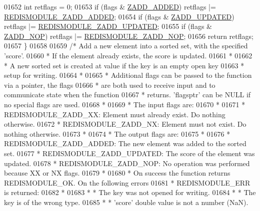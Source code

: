 \begin{DoxyCode}
{{{01652     \textcolor{keywordtype}{int} retflags = 0;
01653     \textcolor{keywordflow}{if} (flags & \hyperlink{server_8h_a2c0f3e2c3a5c73496b732648c69eda18}{ZADD\_ADDED}) retflags |= \hyperlink{redismodule_8h_a5c69099d5d3846f1634c335998a88086}{REDISMODULE\_ZADD\_ADDED};
01654     \textcolor{keywordflow}{if} (flags & \hyperlink{server_8h_aabb6bb7a2a2e73ab9fcda97cf704761b}{ZADD\_UPDATED}) retflags |= 
      \hyperlink{redismodule_8h_a616a231cd3922fde9daac0ff29c8bfdc}{REDISMODULE\_ZADD\_UPDATED};
01655     \textcolor{keywordflow}{if} (flags & \hyperlink{server_8h_afd0096ac4bedddb9b0b7f27396839c06}{ZADD\_NOP}) retflags |= \hyperlink{redismodule_8h_ad63e6e9dea8d9b3d736241007f039268}{REDISMODULE\_ZADD\_NOP};
01656     \textcolor{keywordflow}{return} retflags;
01657 \}
01658 
01659 \textcolor{comment}{/* Add a new element into a sorted set, with the specified 'score'.}
01660 \textcolor{comment}{ * If the element already exists, the score is updated.}
01661 \textcolor{comment}{ *}
01662 \textcolor{comment}{ * A new sorted set is created at value if the key is an empty open key}
01663 \textcolor{comment}{ * setup for writing.}
01664 \textcolor{comment}{ *}
01665 \textcolor{comment}{ * Additional flags can be passed to the function via a pointer, the flags}
01666 \textcolor{comment}{ * are both used to receive input and to communicate state when the function}
01667 \textcolor{comment}{ * returns. 'flagsptr' can be NULL if no special flags are used.}
01668 \textcolor{comment}{ *}
01669 \textcolor{comment}{ * The input flags are:}
01670 \textcolor{comment}{ *}
01671 \textcolor{comment}{ *     REDISMODULE\_ZADD\_XX: Element must already exist. Do nothing otherwise.}
01672 \textcolor{comment}{ *     REDISMODULE\_ZADD\_NX: Element must not exist. Do nothing otherwise.}
01673 \textcolor{comment}{ *}
01674 \textcolor{comment}{ * The output flags are:}
01675 \textcolor{comment}{ *}
01676 \textcolor{comment}{ *     REDISMODULE\_ZADD\_ADDED: The new element was added to the sorted set.}
01677 \textcolor{comment}{ *     REDISMODULE\_ZADD\_UPDATED: The score of the element was updated.}
01678 \textcolor{comment}{ *     REDISMODULE\_ZADD\_NOP: No operation was performed because XX or NX flags.}
01679 \textcolor{comment}{ *}
01680 \textcolor{comment}{ * On success the function returns REDISMODULE\_OK. On the following errors}
01681 \textcolor{comment}{ * REDISMODULE\_ERR is returned:}
01682 \textcolor{comment}{ *}
01683 \textcolor{comment}{ * * The key was not opened for writing.}
01684 \textcolor{comment}{ * * The key is of the wrong type.}
01685 \textcolor{comment}{ * * 'score' double value is not a number (NaN).}
}}}
\end{DoxyCode}
